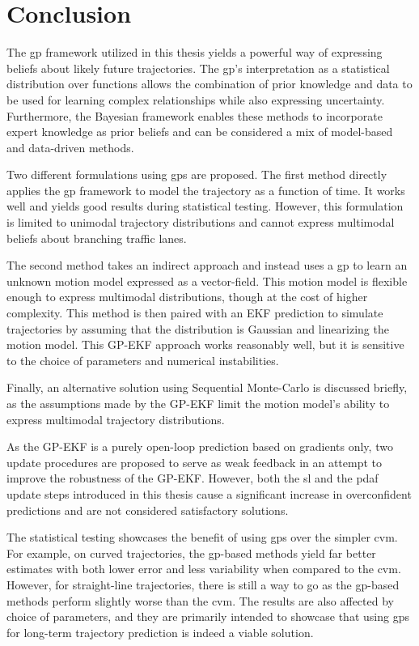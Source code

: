 \chapter{Conclusion}\label{chap:conclusion}
The \acrshort{gp} framework utilized in this thesis yields a powerful way of expressing beliefs about likely future trajectories. The \acrshort{gp}'s interpretation as a statistical distribution over functions allows the combination of prior knowledge and data to be used for learning complex relationships while also expressing uncertainty. Furthermore, the Bayesian framework enables these methods to incorporate expert knowledge as prior beliefs and can be considered a mix of model-based and data-driven methods. 


Two different formulations using \acrshort{gp}s are proposed. The first method directly applies the \acrshort{gp} framework to model the trajectory as a function of time. It works well and yields good results during statistical testing. However, this formulation is limited to unimodal trajectory distributions and cannot express multimodal beliefs about branching traffic lanes. 

The second method takes an indirect approach and instead uses a \acrshort{gp} to learn an unknown motion model expressed as a vector-field. This motion model is flexible enough to express multimodal distributions, though at the cost of higher complexity. This method is then paired with an EKF prediction to simulate trajectories by assuming that the distribution is Gaussian and linearizing the motion model. This GP-EKF approach works reasonably well, but it is sensitive to the choice of parameters and numerical instabilities.

Finally, an alternative solution using Sequential Monte-Carlo is discussed briefly, as the assumptions made by the GP-EKF limit the motion model's ability to express multimodal trajectory distributions.  

As the GP-EKF is a purely open-loop prediction based on gradients only, two update procedures are proposed to serve as weak feedback in an attempt to improve the robustness of the GP-EKF. However, both the \acrshort{sl} and the \acrshort{pdaf} update steps introduced in this thesis cause a significant increase in overconfident predictions and are not considered satisfactory solutions. 

The statistical testing showcases the benefit of using \acrshort{gp}s over the simpler \acrshort{cvm}. For example, on curved trajectories, the \acrshort{gp}-based methods yield far better estimates with both lower error and less variability when compared to the \acrshort{cvm}. However, for straight-line trajectories, there is still a way to go as the \acrshort{gp}-based methods perform slightly worse than the \acrshort{cvm}. The results are also affected by choice of parameters, and they are primarily intended to showcase that using \acrshort{gp}s for long-term trajectory prediction is indeed a viable solution.

